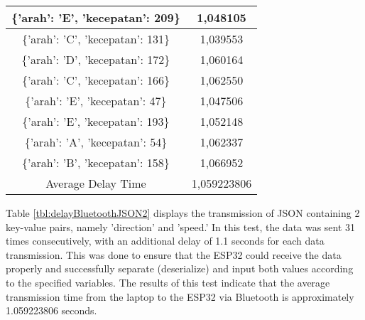 \begin{table}[!h]
\begin{tabular}{|c|c|}
  \{'arah': 'E', 'kecepatan': 209\} & 1,048105    \\ \hline
  \{'arah': 'C', 'kecepatan': 131\} & 1,039553    \\ \hline
  \{'arah': 'D', 'kecepatan': 172\} & 1,060164    \\ \hline
  \{'arah': 'C', 'kecepatan': 166\} & 1,062550    \\ \hline
  \{'arah': 'E', 'kecepatan': 47\}  & 1,047506    \\ \hline
  \{'arah': 'E', 'kecepatan': 193\} & 1,052148    \\ \hline
  \{'arah': 'A', 'kecepatan': 54\}  & 1,062337    \\ \hline
  \{'arah': 'B', 'kecepatan': 158\} & 1,066952    \\ \hline
  Average Delay Time                & 1,059223806 \\ \hline
  \end{tabular}
\end{table}

Table \ref{tbl:delayBluetoothJSON2} displays the transmission of JSON containing 2 key-value pairs, namely 'direction' and 'speed.' In this test, the data was sent 31 times consecutively, with an additional delay of 1.1 seconds for each data transmission. This was done to ensure that the ESP32 could receive the data properly and successfully separate (deserialize) and input both values according to the specified variables. The results of this test indicate that the average transmission time from the laptop to the ESP32 via Bluetooth is approximately 1.059223806 seconds.

